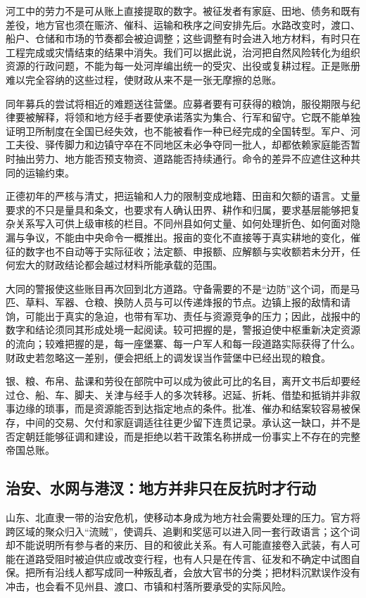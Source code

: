 河工中的劳力不是可从账上直接提取的数字。被征发者有家庭、田地、债务和既有差役，地方官也须在赈济、催科、运输和秩序之间安排先后。水路改变时，渡口、船户、仓储和市场的节奏都会被迫调整；这些调整有时会进入地方材料，有时只在工程完成或灾情结束的结果中消失。我们可以据此说，治河把自然风险转化为组织资源的行政问题，不能为每一处河岸编出统一的受灾、出役或复耕过程。正是账册难以完全容纳的这些过程，使财政从来不是一张无摩擦的总账。

同年募兵的尝试将相近的难题送往营堡。应募者要有可获得的粮饷，服役期限与纪律要被解释，将领和地方经手者要使承诺落实为集合、行军和留守。它既不能单独证明卫所制度在全国已经失效，也不能被看作一种已经完成的全国转型。军户、河工夫役、驿传脚力和边镇守卒在不同地区未必争夺同一批人，却都依赖家庭能否暂时抽出劳力、地方能否预支物资、道路能否持续通行。命令的差异不应遮住这种共同的运输约束。

正德初年的严核与清丈，把运输和人力的限制变成地籍、田亩和欠额的语言。丈量要求的不只是量具和条文，也要求有人确认田界、耕作和归属，要求基层能够把复杂关系写入可供上级审核的栏目。不同州县如何丈量、如何处理折色、如何面对隐漏与争议，不能由中央命令一概推出。报亩的变化不直接等于真实耕地的变化，催征的数字也不自动等于实际征收；法定额、申报额、应解额与实收额若未分开，任何宏大的财政结论都会越过材料所能承载的范围。

大同的警报使这些账目再次回到北方道路。守备需要的不是“边防”这个词，而是马匹、草料、军器、仓粮、换防人员与可以传递烽报的节点。边镇上报的敌情和请饷，可能出于真实的急迫，也带有军功、责任与资源竞争的压力；因此，战报中的数字和结论须同其形成处境一起阅读。较可把握的是，警报迫使中枢重新决定资源的流向；较难把握的是，每一座堡寨、每一户军人和每一段道路实际获得了什么。财政史若忽略这一差别，便会把纸上的调发误当作营堡中已经出现的粮食。

银、粮、布帛、盐课和劳役在部院中可以成为彼此可比的名目，离开文书后却要经过仓、船、车、脚夫、关津与经手人的多次转移。迟延、折耗、借垫和抵销并非叙事边缘的琐事，而是资源能否到达指定地点的条件。批准、催办和结案较容易被保存，中间的交易、欠付和家庭调适往往更少留下连贯记录。承认这一缺口，并不是否定朝廷能够征调和建设，而是拒绝以若干政策名称拼成一份事实上不存在的完整帝国总账。

\subsection{治安、水网与港汊：地方并非只在反抗时才行动}

山东、北直隶一带的治安危机，使移动本身成为地方社会需要处理的压力。官方将跨区域的聚众归入“流贼”，使调兵、追剿和奖惩可以进入同一套行政语言；这个词却不能说明所有参与者的来历、目的和彼此关系。有人可能直接卷入武装，有人可能在道路受阻时被迫供应或改变行程，也有人只是在传言、征发和不确定中试图自保。把所有沿线人都写成同一种叛乱者，会放大官书的分类；把材料沉默误作没有冲击，也会看不见州县、渡口、市镇和村落所要承受的实际风险。

